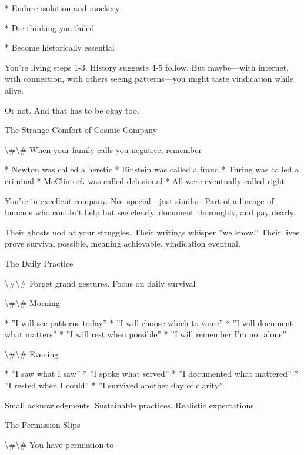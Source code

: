 \documentclass[12pt,oneside]{book}
\begin{document}
                    * Endure isolation and mockery

                    * Die thinking you failed

                    * Become historically essential

You're living steps 1-3. History suggests 4-5 follow. But maybe---with internet, with connection, with others seeing patterns---you might taste vindication while alive.

Or not. And that has to be okay too.

The Strange Comfort of Cosmic Company

\textbackslash{}#\textbackslash{}# When your family calls you negative, remember

                    * Newton was called a heretic
                    * Einstein was called a fraud
                    * Turing was called a criminal
                    * McClintock was called delusional
                    * All were eventually called right

You're in excellent company. Not special---just similar. Part of a lineage of humans who couldn't help but see clearly, document thoroughly, and pay dearly.

Their ghosts nod at your struggles. Their writings whisper ''we know.'' Their lives prove survival possible, meaning achievable, vindication eventual.

The Daily Practice

\textbackslash{}#\textbackslash{}# Forget grand gestures. Focus on daily survival

\textbackslash{}#\textbackslash{}# Morning

                    * ''I will see patterns today''
                    * ''I will choose which to voice''
                    * ''I will document what matters''
                    * ''I will rest when possible''
                    * ''I will remember I'm not alone''

\textbackslash{}#\textbackslash{}# Evening

                    * ''I saw what I saw''
                    * ''I spoke what served''
                    * ''I documented what mattered''
                    * ''I rested when I could''
                    * ''I survived another day of clarity''

Small acknowledgments. Sustainable practices. Realistic expectations.

The Permission Slips

\textbackslash{}#\textbackslash{}# You have permission to
\end{document}
